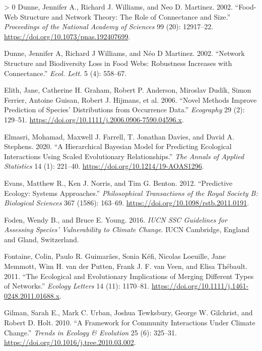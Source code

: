 \documentclass[11pt]{article}
\newlength{\cslhangindent}
\newenvironment{CSLReferences}[3] %
 {%
  \setlength{\parindent}{0pt}
  \ifodd #1 \everypar{\setlength{\hangindent}{\cslhangindent}}\ignorespaces\fi
  \ifnum #2 > 0
  \setlength{\parskip}{#2\baselineskip}
  \fi
 }%
 {}
\begin{document}
\begin{CSLReferences}{1}{0}
\leavevmode\hypertarget{ref-Dunne2002FooStr}{}%
Dunne, Jennifer A., Richard J. Williams, and Neo D. Martinez. 2002.
{``Food-Web Structure and Network Theory: The Role of Connectance and
Size.''} \emph{Proceedings of the National Academy of Sciences} 99 (20):
12917--22. \url{https://doi.org/10.1073/pnas.192407699}.

\leavevmode\hypertarget{ref-Dunne2002NetStr}{}%
Dunne, Jennifer A, Richard J Williams, and Néo D Martinez. 2002.
{``Network Structure and Biodiversity Loss in Food Webs: Robustness
Increases with Connectance.''} \emph{Ecol. Lett.} 5 (4): 558--67.

\leavevmode\hypertarget{ref-Elith2006NovMet}{}%
Elith, Jane, Catherine H. Graham, Robert P. Anderson, Miroslav Dudík,
Simon Ferrier, Antoine Guisan, Robert J. Hijmans, et al. 2006. {``Novel
Methods Improve Prediction of Species' Distributions from Occurrence
Data.''} \emph{Ecography} 29 (2): 129--51.
\url{https://doi.org/10.1111/j.2006.0906-7590.04596.x}.

\leavevmode\hypertarget{ref-Elmasri2020HieBay}{}%
Elmasri, Mohamad, Maxwell J. Farrell, T. Jonathan Davies, and David A.
Stephens. 2020. {``A Hierarchical Bayesian Model for Predicting
Ecological Interactions Using Scaled Evolutionary Relationships.''}
\emph{The Annals of Applied Statistics} 14 (1): 221--40.
\url{https://doi.org/10.1214/19-AOAS1296}.

\leavevmode\hypertarget{ref-Evans2012PreEco}{}%
Evans, Matthew R., Ken J. Norris, and Tim G. Benton. 2012. {``Predictive
Ecology: Systems Approaches.''} \emph{Philosophical Transactions of the
Royal Society B: Biological Sciences} 367 (1586): 163--69.
\url{https://doi.org/10.1098/rstb.2011.0191}.

\leavevmode\hypertarget{ref-Foden2016IucSsc}{}%
Foden, Wendy B., and Bruce E. Young. 2016. \emph{IUCN SSC Guidelines for
Assessing Species' Vulnerability to Climate Change}. IUCN Cambridge,
England and Gland, Switzerland.

\leavevmode\hypertarget{ref-Fontaine2011EcoEvo}{}%
Fontaine, Colin, Paulo R. Guimarães, Sonia Kéfi, Nicolas Loeuille, Jane
Memmott, Wim H. van der Putten, Frank J. F. van Veen, and Elisa
Thébault. 2011. {``The Ecological and Evolutionary Implications of
Merging Different Types of Networks.''} \emph{Ecology Letters} 14 (11):
1170--81. \url{https://doi.org/10.1111/j.1461-0248.2011.01688.x}.

\leavevmode\hypertarget{ref-Gilman2010FraCom}{}%
Gilman, Sarah E., Mark C. Urban, Joshua Tewksbury, George W. Gilchrist,
and Robert D. Holt. 2010. {``A Framework for Community Interactions
Under Climate Change.''} \emph{Trends in Ecology \& Evolution} 25 (6):
325--31. \url{https://doi.org/10.1016/j.tree.2010.03.002}.


\end{CSLReferences}
\end{document}
